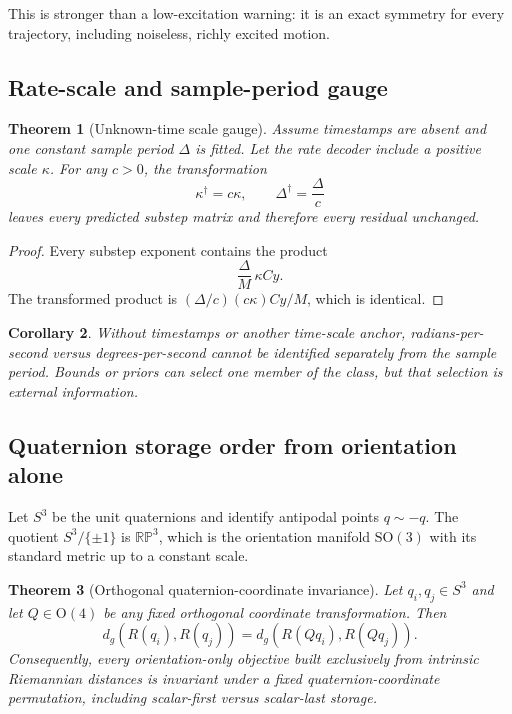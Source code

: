 \documentclass[11pt]{article}
\newtheorem{theorem}{Theorem}
\newtheorem{corollary}[theorem]{Corollary}
\newcommand{\SO}{\mathrm{SO}(3)}
\newcommand{\OO}{\mathrm{O}}
\begin{document}
    This is stronger than a low-excitation warning: it is an exact symmetry for every
    trajectory, including noiseless, richly excited motion.

    \subsection{Rate-scale and sample-period gauge}

    \begin{theorem}[Unknown-time scale gauge]\label{thm:time-scale-gauge}
        Assume timestamps are absent and one constant sample period $\Delta$ is fitted. Let the
        rate decoder include a positive scale $\kappa$. For any $c>0$, the transformation
        \begin{equation}
            \kappa^\dagger=c\kappa,
            \qquad
            \Delta^\dagger=\frac{\Delta}{c}
        \end{equation}
        leaves every predicted substep matrix and therefore every residual unchanged.
    \end{theorem}

    \begin{proof}
        Every substep exponent contains the product
        \begin{equation}
            \frac{\Delta}{M}\,\kappa C y.
        \end{equation}
        The transformed product is
        $(\Delta/c)(c\kappa)Cy/M$, which is identical.
    \end{proof}

    \begin{corollary}
        Without timestamps or another time-scale anchor, radians-per-second versus
        degrees-per-second cannot be identified separately from the sample period. Bounds or
        priors can select one member of the class, but that selection is external information.
    \end{corollary}

    \subsection{Quaternion storage order from orientation alone}

    Let $S^3$ be the unit quaternions and identify antipodal points $q\sim-q$. The quotient
    $S^3/\{\pm1\}$ is $\mathbb{RP}^3$, which is the orientation manifold $\SO$ with its
    standard metric up to a constant scale.

    \begin{theorem}[Orthogonal quaternion-coordinate invariance]\label{thm:quaternion-o4}
        Let $q_i,q_j\in S^3$ and let $Q\in\OO(4)$ be any fixed orthogonal coordinate
        transformation. Then
        \begin{equation}
            d_g(R(q_i),R(q_j))
            =d_g(R(Qq_i),R(Qq_j)).
        \end{equation}
        Consequently, every orientation-only objective built exclusively from intrinsic
        Riemannian distances is invariant under a fixed quaternion-coordinate permutation,
        including scalar-first versus scalar-last storage.
    \end{theorem}
\end{document}
